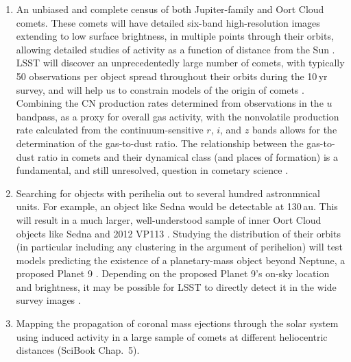 \begin{enumerate}
\item An unbiased and complete census of both Jupiter-family and Oort Cloud
comets. These comets will have detailed six-band high-resolution
images extending to low surface brightness, in multiple points through
their orbits, allowing detailed studies of activity as a function of
distance from the Sun \citep{1999A&A...349..649L,2004come.book...17A}.
LSST will
discover an unprecedentedly large number of comets, with typically 50
observations per object spread throughout their orbits during the 10\,yr
survey, and will help us to constrain models of the origin of comets
\citep{2010PhDT.......241S,2016AJ....152..103S}.  Combining the CN production
rates determined from observations in the $u$ bandpass, as a proxy for overall
gas activity, with the nonvolatile production rate calculated from the
continuum-sensitive $r$, $i$, and $z$ bands allows for the determination of the
gas-to-dust ratio.  The relationship between the gas-to-dust ratio in comets
and their dynamical class (and places of formation) is a fundamental, and still
unresolved, question in cometary science \citep[see,
e.g.,][]{1995Icar..118..223A,2017RSPTA.37560252B}.

\item Searching for objects with perihelia out to several hundred astronmnical units. For example, an object
like Sedna \citep{2004ApJ...617..645B} would be detectable at 130\,au. This will result
in a much larger, well-understood sample of inner Oort Cloud objects like Sedna and 2012 VP113
 \citep{2014Natur.507..471T}.  Studying the distribution of their orbits (in particular including any
clustering in the argument of perihelion) will test models predicting the existence of a planetary-mass object beyond Neptune, a proposed Planet 9 \citep{2014Natur.507..471T,2016AJ....151...22B,2016ApJ...824L..23B,2016AJ....152..221S,2017AJ....154...65B}. Depending on the proposed Planet 9's on-sky location and brightness, it may be possible for LSST to directly detect it in the wide survey images \citep{2016AJ....151...22B,2016ApJ...824L..23B,2016AJ....152..221S,2017AJ....154...65B}.

\item Mapping the propagation of coronal mass ejections through the
  solar system using induced
 activity in a large sample of comets at different heliocentric distances
(SciBook Chap.~5).


\end{enumerate}
